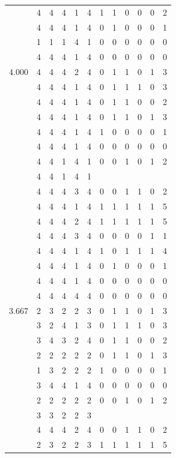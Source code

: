 \documentclass[]{msu-thesis}
\theoremstyle{definition}
\theoremstyle{definition}
\theoremstyle{definition}
\theoremstyle{remark}
\begin{document}
\begin{table}
{\begin{tabular}[t]{rrrrrrrrrrrr}
 & 4 & 4 & 4 & 1 & 4 & 1 & 1 & 0 & 0 & 0 & 2\\
 & 4 & 4 & 4 & 1 & 4 & 0 & 1 & 0 & 0 & 0 & 1\\
 & 1 & 1 & 1 & 4 & 1 & 0 & 0 & 0 & 0 & 0 & 0\\
 & 4 & 4 & 4 & 1 & 4 & 0 & 0 & 0 & 0 & 0 & 0\\
4.000 & 4 & 4 & 4 & 2 & 4 & 0 & 1 & 1 & 0 & 1 & 3\\
 & 4 & 4 & 4 & 1 & 4 & 0 & 1 & 1 & 1 & 0 & 3\\
 & 4 & 4 & 4 & 1 & 4 & 0 & 1 & 1 & 0 & 0 & 2\\
 & 4 & 4 & 4 & 1 & 4 & 0 & 1 & 1 & 0 & 1 & 3\\
 & 4 & 4 & 4 & 1 & 4 & 1 & 0 & 0 & 0 & 0 & 1\\
 & 4 & 4 & 4 & 1 & 4 & 0 & 0 & 0 & 0 & 0 & 0\\
 & 4 & 4 & 1 & 4 & 1 & 0 & 0 & 1 & 0 & 1 & 2\\
 & 4 & 4 & 1 & 4 & 1 &  &  &  &  &  & \\
 & 4 & 4 & 4 & 3 & 4 & 0 & 0 & 1 & 1 & 0 & 2\\
 & 4 & 4 & 4 & 1 & 4 & 1 & 1 & 1 & 1 & 1 & 5\\
 & 4 & 4 & 4 & 2 & 4 & 1 & 1 & 1 & 1 & 1 & 5\\
 & 4 & 4 & 4 & 3 & 4 & 0 & 0 & 0 & 0 & 1 & 1\\
 & 4 & 4 & 4 & 1 & 4 & 1 & 0 & 1 & 1 & 1 & 4\\
 & 4 & 4 & 4 & 1 & 4 & 0 & 1 & 0 & 0 & 0 & 1\\
 & 4 & 4 & 4 & 1 & 4 & 0 & 0 & 0 & 0 & 0 & 0\\
 & 4 & 4 & 4 & 4 & 4 & 0 & 0 & 0 & 0 & 0 & 0\\
3.667 & 2 & 3 & 2 & 2 & 3 & 0 & 1 & 1 & 0 & 1 & 3\\
 & 3 & 2 & 4 & 1 & 3 & 0 & 1 & 1 & 1 & 0 & 3\\
 & 3 & 4 & 3 & 2 & 4 & 0 & 1 & 1 & 0 & 0 & 2\\
 & 2 & 2 & 2 & 2 & 2 & 0 & 1 & 1 & 0 & 1 & 3\\
 & 1 & 3 & 2 & 2 & 2 & 1 & 0 & 0 & 0 & 0 & 1\\
 & 3 & 4 & 4 & 1 & 4 & 0 & 0 & 0 & 0 & 0 & 0\\
 & 2 & 2 & 2 & 2 & 2 & 0 & 0 & 1 & 0 & 1 & 2\\
 & 3 & 3 & 2 & 2 & 3 &  &  &  &  &  & \\
 & 4 & 4 & 4 & 2 & 4 & 0 & 0 & 1 & 1 & 0 & 2\\
 & 2 & 3 & 2 & 2 & 3 & 1 & 1 & 1 & 1 & 1 & 5\\

\end{tabular}}
\end{table}
\end{document}

